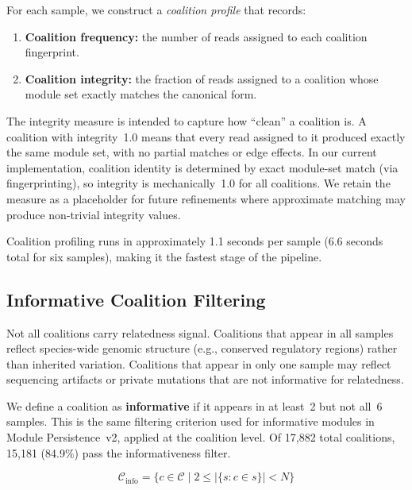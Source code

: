 \documentclass{../yalumba}
\begin{document}
For each sample, we construct a \emph{coalition profile} that records:

\begin{enumerate}
  \item \textbf{Coalition frequency:} the number of reads assigned to each
        coalition fingerprint.
  \item \textbf{Coalition integrity:} the fraction of reads assigned to a
        coalition whose module set exactly matches the canonical form.
\end{enumerate}

The integrity measure is intended to capture how ``clean'' a coalition is.
A coalition with integrity~1.0 means that every read assigned to it produced
exactly the same module set, with no partial matches or edge effects.  In our
current implementation, coalition identity is determined by exact module-set
match (via fingerprinting), so integrity is mechanically~1.0 for all
coalitions.  We retain the measure as a placeholder for future refinements
where approximate matching may produce non-trivial integrity values.

Coalition profiling runs in approximately 1.1 seconds per sample (6.6 seconds
total for six samples), making it the fastest stage of the pipeline.

\subsection{Informative Coalition Filtering}
\label{sec:methods-filtering}

Not all coalitions carry relatedness signal.  Coalitions that appear in all
samples reflect species-wide genomic structure (e.g., conserved regulatory
regions) rather than inherited variation.  Coalitions that appear in only one
sample may reflect sequencing artifacts or private mutations that are not
informative for relatedness.

We define a coalition as \textbf{informative} if it appears in at least~2
but not all~6 samples.  This is the same filtering criterion used for
informative modules in Module Persistence~v2, applied at the coalition level.
Of 17{,}882 total coalitions, 15{,}181 (84.9\%) pass the informativeness
filter.

\begin{equation}
  \mathcal{C}_{\mathrm{info}} = \{c \in \mathcal{C} \mid 2 \leq |\{s : c \in s\}| < N\}
  \label{eq:informative}
\end{equation}
\end{document}
